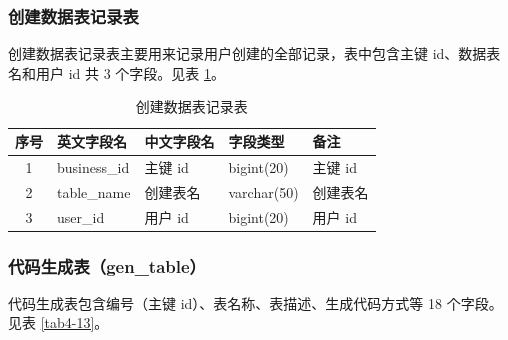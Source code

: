 \documentclass{izdthesis}
\begin{document}
\subsubsection{创建数据表记录表}
创建数据表记录表主要用来记录用户创建的全部记录，表中包含主键 id、数据表名和用户 id 共 3 个字段。见表 \ref{tab4-12}。

\begin{table}[H]
  \centering
  \caption{创建数据表记录表}
  \label{tab4-12}
  \songti
  \begin{tabular}{c l l l l}
    \toprule
    序号 & 英文字段名 & 中文字段名 & 字段类型 & 备注 \\
    \midrule
    1 & business\_id & 主键 id & bigint(20) & 主键 id \\
    2 & table\_name & 创建表名 & varchar(50) & 创建表名 \\
    3 & user\_id & 用户 id & bigint(20) & 用户 id \\
    \bottomrule
  \end{tabular}
\end{table}

\subsubsection{代码生成表（gen\_table）}
代码生成表包含编号（主键 id）、表名称、表描述、生成代码方式等 18 个字段。见表 \ref{tab4-13}。
\end{document}

